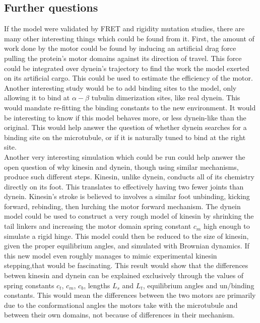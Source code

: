 \documentclass[
11pt, %
english, %
singlespacing, %
headsepline, %
chapterinoneline, %
]{MastersDoctoralThesis} %
\begin{document}

\subsection{Further questions}
If the model were validated by FRET and rigidity mutation studies, there are many other interesting things which could be found from it. First, the amount of work done by the motor could be found by inducing an artificial drag force pulling the protein's motor domains against its direction of travel. This force could be integrated over dynein's trajectory to find the work the model exerted on its artificial cargo. This could be used to estimate the efficiency of the motor. Another interesting study would be to add binding sites to the model, only allowing it to bind at $\alpha-\beta$ tubulin dimerization sites, like real dynein. This would mandate re-fitting the binding constants to the new environment. It would be interesting to know if this model behaves more, or less dynein-like than the original. This would help answer the question of whether dynein searches for a binding site on the microtubule, or if it is naturally tuned to bind at the right site.\\

Another very interesting simulation which could be run could help answer the open question of why kinesin and dynein, though using similar mechanisms, produce such different steps. Kinesin, unlike dynein, conducts all of its chemistry directly on its foot. This translates to effectively having two fewer joints than dynein. Kinesin's stroke is believed to involves a similar foot unbinding, kicking forward, rebinding, then lurching the motor forward mechanism. The dynein model could be used to construct a very rough model of kinesin by shrinking the tail linkers and increasing the motor domain spring constant $c_m$ high enough to simulate a rigid hinge. This model could then be reduced to the size of kinesin, given the proper equilibrium angles, and simulated with Brownian dynamics. If this new model even roughly manages to mimic experimental kinesin stepping,that would be fascinating. This result would show that the differences betwen kinesin and dynein can be explained exclusively through the values of spring constants $c_t$, $c_m$, $c_b$, lengths $L_s$ and $L_t$, equilibrium angles and un/binding constants. This would mean the differences between the two motors are primarily due to the conformational angles the motors take with the microtubule and between their own domains, not because of differences in their mechanism.\\
\end{document}
